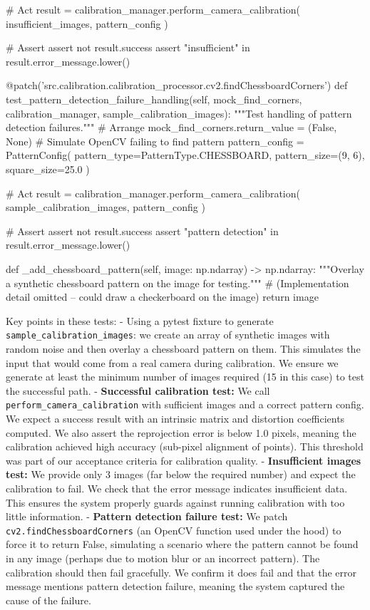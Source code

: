 \documentclass[11pt,a4paper]{report}
\begin{document}
            # Act
            result = calibration\_manager.perform\_camera\_calibration(
                insufficient\_images, 
                pattern\_config
            )

            # Assert
            assert not result.success
            assert "insufficient" in result.error\_message.lower()

        @patch('src.calibration.calibration\_processor.cv2.findChessboardCorners')
        def test\_pattern\_detection\_failure\_handling(self, mock\_find\_corners, calibration\_manager, sample\_calibration\_images):
            """Test handling of pattern detection failures."""
            # Arrange
            mock\_find\_corners.return\_value = (False, None)  # Simulate OpenCV failing to find pattern
            pattern\_config = PatternConfig(
                pattern\_type=PatternType.CHESSBOARD,
                pattern\_size=(9, 6),
                square\_size=25.0
            )

            # Act
            result = calibration\_manager.perform\_camera\_calibration(
                sample\_calibration\_images, 
                pattern\_config
            )

            # Assert
            assert not result.success
            assert "pattern detection" in result.error\_message.lower()

        def \_add\_chessboard\_pattern(self, image: np.ndarray) -> np.ndarray:
            """Overlay a synthetic chessboard pattern on the image for testing."""
            # (Implementation detail omitted – could draw a checkerboard on the image)
            return image

Key points in these tests: - Using a pytest fixture to generate
\texttt{sample\_calibration\_images}: we create an array of synthetic images with
random noise and then overlay a chessboard pattern on them. This
simulates the input that would come from a real camera during
calibration. We ensure we generate at least the minimum number of images
required (15 in this case) to test the successful path. - \textbf{Successful
calibration test:} We call \texttt{perform\_camera\_calibration} with sufficient
images and a correct pattern config. We expect a success result with an
intrinsic matrix and distortion coefficients computed. We also assert
the reprojection error is below 1.0 pixels, meaning the calibration
achieved high accuracy (sub-pixel alignment of points). This threshold
was part of our acceptance criteria for calibration quality. -
\textbf{Insufficient images test:} We provide only 3 images (far below the
required number) and expect the calibration to fail. We check that the
error message indicates insufficient data. This ensures the system
properly guards against running calibration with too little
information. - \textbf{Pattern detection failure test:} We patch
\texttt{cv2.findChessboardCorners} (an OpenCV function used under the hood) to
force it to return False, simulating a scenario where the pattern cannot
be found in any image (perhaps due to motion blur or an incorrect
pattern). The calibration should then fail gracefully. We confirm it
does fail and that the error message mentions pattern detection failure,
meaning the system captured the cause of the failure.
\end{document}
